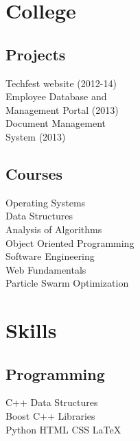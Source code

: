 \documentclass[]{deedy-resume-openfont}
\begin{document}
\begin{minipage}[t]{0.33\textwidth}

\section{College}
\subsection{Projects}
Techfest website (2012-14) \\
Employee Database and \\
Management Portal (2013) \\
Document Management \\
System (2013) \\
\sectionsep

\subsection{Courses}
Operating Systems \\
Data Structures \\
Analysis of Algorithms \\
Object Oriented Programming \\
Software Engineering \\
Web Fundamentals \\
Particle Swarm Optimization \\
\sectionsep


\section{Skills}
\subsection{Programming}
C++ \textbullet{} Data Structures \\
Boost C++ Libraries \\
Python \textbullet{} HTML \textbullet{} CSS \textbullet{}  \LaTeX\ \\
\sectionsep


\end{minipage}
\end{document}
